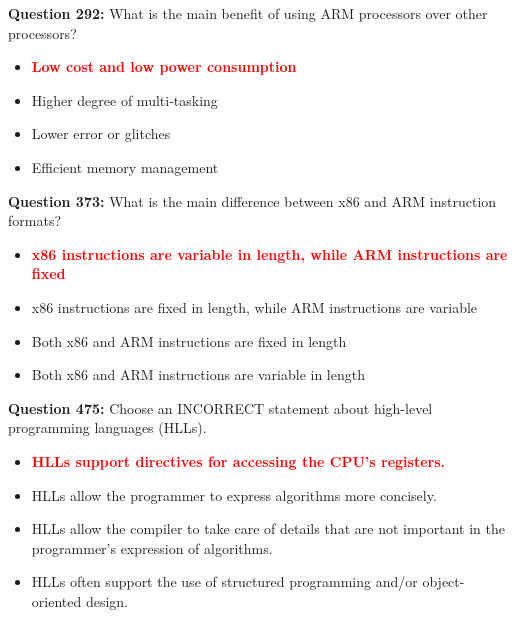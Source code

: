 \documentclass[12pt,a4paper]{article}
\begin{document}
\vspace{0.5cm}

\textbf{Question 292:} What is the main benefit of using ARM processors over other processors?

\begin{itemize}
    \item[\textbf{A.}] \textcolor{red}{\textbf{Low cost and low power consumption}}
    \item[\textbf{B.}] Higher degree of multi-tasking
    \item[\textbf{C.}] Lower error or glitches
    \item[\textbf{D.}] Efficient memory management
\end{itemize}

\vspace{0.5cm}

\vspace{0.5cm}

\textbf{Question 373:} What is the main difference between x86 and ARM instruction formats?

\begin{itemize}
    \item[\textbf{A.}] \textcolor{red}{\textbf{x86 instructions are variable in length, while ARM instructions are fixed}}
    \item[\textbf{B.}] x86 instructions are fixed in length, while ARM instructions are variable
    \item[\textbf{C.}] Both x86 and ARM instructions are fixed in length
    \item[\textbf{D.}] Both x86 and ARM instructions are variable in length
\end{itemize}

\vspace{0.5cm}

\vspace{0.5cm}

\textbf{Question 475:} Choose an INCORRECT statement about high-level programming languages (HLLs).

\begin{itemize}
    \item[\textbf{A.}] \textcolor{red}{\textbf{HLLs support directives for accessing the CPU's registers.}}
    \item[\textbf{B.}] HLLs allow the programmer to express algorithms more concisely.
    \item[\textbf{C.}] HLLs allow the compiler to take care of details that are not important in the programmer's expression of algorithms.
    \item[\textbf{D.}] HLLs often support the use of structured programming and/or object-oriented design.
\end{itemize}
\end{document}
